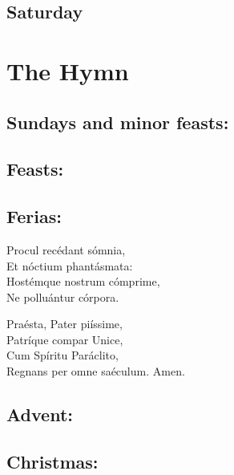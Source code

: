 \documentclass[ebook,12pt,twoside,openany]{memoir}
\begin{document}

\section{Saturday}





\chapter{The Hymn}

\section{Sundays and minor feasts:}


\section{Feasts:}


\section{Ferias:}


Procul recédant sómnia,\\
Et nóctium phantásmata:\\
Hostémque nostrum cómprime,\\
Ne polluántur córpora.

Praésta, Pater piíssime,\\
Patríque compar Unice,\\
Cum Spíritu Paráclito,\\
Regnans per omne saéculum.  Amen.

\section{Advent:}


\section{Christmas:}

\end{document}
